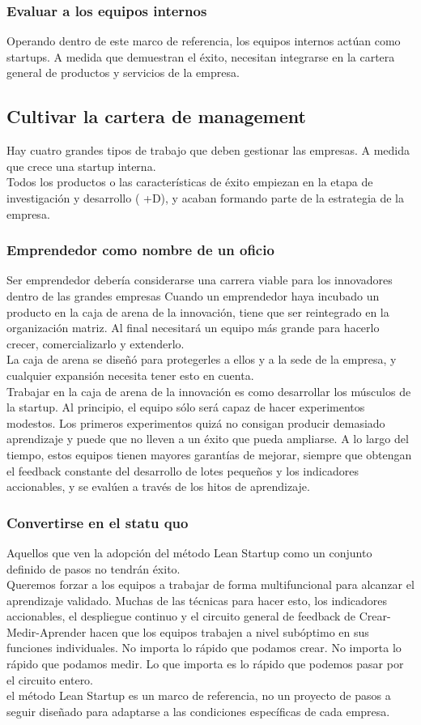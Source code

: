\documentclass[10pt]{article}
\begin{document}
\begin{multicols}{2}
\subsubsection*{Evaluar a los equipos internos}
Operando dentro de este marco de referencia, los equipos internos actúan como startups. A medida que demuestran el éxito, necesitan integrarse en la cartera general de productos y servicios de la empresa.
\subsection*{Cultivar la cartera de management}
Hay cuatro grandes tipos de trabajo que deben gestionar las empresas. A medida que crece una startup interna.\\ 
Todos los productos o las características de éxito empiezan en la etapa de investigación y desarrollo ( +D), y acaban formando parte de la estrategia de la empresa. 
\subsubsection*{Emprendedor como nombre de un oficio}
{\color{red}Ser emprendedor debería considerarse una carrera viable para los innovadores dentro de las grandes empresas}
Cuando un emprendedor haya incubado un producto en la caja de arena de la innovación, tiene que ser reintegrado en la organización matriz. Al final necesitará un equipo más grande para hacerlo crecer, comercializarlo y extenderlo.\\
La caja de arena se diseñó para protegerles a ellos y a la sede de la empresa, y cualquier expansión necesita tener esto en cuenta.\\
Trabajar en la caja de arena de la innovación es como desarrollar los músculos de la startup. Al principio, el equipo sólo será capaz de hacer experimentos modestos. Los primeros experimentos quizá no consigan producir demasiado aprendizaje y puede que no lleven a un éxito que pueda ampliarse. A lo largo del tiempo, estos equipos tienen mayores garantías de mejorar, siempre que obtengan el feedback constante del desarrollo de lotes pequeños y los indicadores accionables, y se evalúen a través de los hitos de aprendizaje.
\subsubsection*{Convertirse en el statu quo}
{\color{red}Aquellos que ven la adopción del método Lean Startup como un conjunto definido de pasos no tendrán éxito}.\\
Queremos forzar a los equipos a trabajar de forma multifuncional para alcanzar el aprendizaje validado. Muchas de las técnicas para hacer esto, los indicadores accionables, el despliegue continuo y el circuito general de feedback de Crear-Medir-Aprender hacen que los equipos trabajen a nivel subóptimo en sus funciones individuales. No importa lo rápido que podamos crear. {\color{red}No importa lo rápido que podamos medir. Lo que importa es lo rápido que podemos pasar por el circuito entero.\\
el método Lean Startup es un marco de referencia, no un proyecto de pasos a seguir diseñado para adaptarse a las condiciones específicas de cada empresa}.

\end{multicols}
\end{document}
